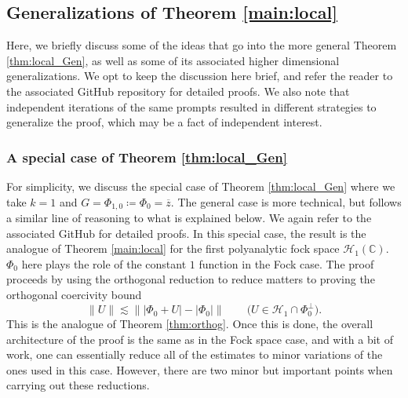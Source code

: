 \documentclass[11pt]{amsart}
\theoremstyle{remark}
\newcommand{\abs}[1]{\lvert #1 \rvert}
\newcommand{\norm}[1]{\lVert #1 \rVert}
\begin{document}
\subsection{Generalizations of Theorem \ref{main:local}} Here, we briefly discuss some of the ideas that go into the more general Theorem \ref{thm:local_Gen}, as well as some of its associated higher dimensional generalizations. We opt to keep the discussion here brief, and refer the reader to the associated GitHub repository for detailed proofs. We also note that independent iterations of the same prompts resulted in different strategies to generalize the proof, which may be a fact of independent interest.
\medskip

\subsubsection{A special case of Theorem \ref{thm:local_Gen}} For simplicity, we discuss the special case of Theorem \ref{thm:local_Gen} where we take $k=1$ and $G=\Phi_{1,0}\coloneq \Phi_0=\overline{z}$. The general case is more technical, but follows a similar line of reasoning to what is explained below. We again refer to the associated GitHub for detailed proofs. In this special case, the result is the analogue of Theorem \ref{main:local} for the first polyanalytic fock space $\mathcal{H}_1(\mathbb{C})$. $\Phi_0$ here plays the role of the constant $1$ function in the Fock case. The proof proceeds by using the orthogonal reduction to reduce matters to proving the orthogonal coercivity bound
\begin{equation}\label{orthcoercivityhermite}
\norm{U}
\lesssim
\norm{\abs{\Phi_0 + U} - \abs{\Phi_0}}
\qquad
\bigl(U \in \mathcal{H}_1 \cap \Phi_0^\perp\bigr).
\end{equation}
This is the analogue of Theorem \ref{thm:orthog}. Once this is done, the overall architecture of the proof is the same as in the Fock space case, and with a bit of work, one can essentially reduce all of the estimates to minor variations of the ones used in this case. However, there are two minor but important points when carrying out these reductions.
\end{document}
